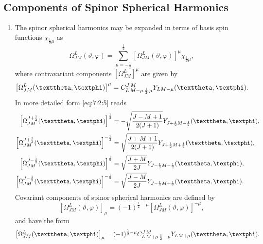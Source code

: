\subsection{Components of Spinor Spherical Harmonics}\label{sec:7.2.2}
\begin{enumerate}[label=(\alph*)]
\item The spinor spherical harmonics may be expanded in terms of basis spin functions $\chi_{\frac{1}{2} \mu}$ as
\begin{equation}
\Omega_{J M}^{L}(\vartheta, \varphi)=\sum_{\mu=-\frac{1}{2}}^{\frac{1}{2}}\left[\Omega_{J M}^{L}(\vartheta, \varphi)\right]^{\mu} \chi_{\frac{1}{2} \mu}, \label{eq:7:2:4}
\end{equation}
where contravariant components $\left[\Omega_{J M}^{L}\right]^{\mu}$ are given by
\begin{equation}
\left[\Omega_{J M}^{L}(\vartheta, \varphi)\right]^{\mu}=\clebsch{L}{M-\mu}{\frac{1}{2}}{\mu}{J}{M} Y_{L M-\mu}(\vartheta, \varphi). \label{eq:7:2:5}
\end{equation}
In more detailed form \eqref{eq:7:2:5} reads
\begin{align}
{\left[\Omega_{J M}^{J+\frac{1}{2}}(\vartheta, \varphi)\right]^{\frac{1}{2}} } & =-\sqrt{\frac{J-M+1}{2(J+1)}} Y_{J+\frac{1}{2} M-\frac{1}{2}}(\vartheta, \varphi), \notag\\
{\left[\Omega_{J M}^{J+\frac{1}{2}}(\vartheta, \varphi)\right]^{-\frac{1}{2}} } & =\sqrt{\frac{J+M+1}{2(J+1)}} Y_{J+\frac{1}{2} M+\frac{1}{2}}(\vartheta, \varphi), \label{eq:7:2:6}\\
{\left[\Omega_{J M}^{J-\frac{1}{2}}(\vartheta, \varphi)\right]^{\frac{1}{2}} } & =\sqrt{\frac{J+M}{2 J}} Y_{J-\frac{1}{2} M-\frac{1}{2}}(\vartheta, \varphi), \notag\\
{\left[\Omega_{J M}^{J-\frac{1}{2}}(\vartheta, \varphi)\right]^{-\frac{1}{2}} } & =\sqrt{\frac{J-M}{2 J}} Y_{J-\frac{1}{2} M+\frac{1}{2}}(\vartheta, \varphi). \label{eq:7:2:7}
\end{align}
Covariant components of spinor spherical harmonics are defined by
\begin{equation}
\left[\Omega_{J M}^{L}(\vartheta, \varphi)\right]_{\mu}=(-1)^{\frac{1}{2}-\mu}\left[\Omega_{J M}^{L}(\vartheta, \varphi)\right]^{-\mu}, \label{eq:7:2:8}
\end{equation}
and have the form
\begin{equation}
\left[\Omega_{J M}^{L}(\vartheta, \varphi)\right]_{\mu}=(-1)^{\frac{1}{2}-\mu} \clebsch{L}{M+\mu}{\frac{1}{2}}{-\mu}{J}{M} Y_{L M+\mu}(\vartheta, \varphi). \label{eq:7:2:9}

\end{equation}
\end{enumerate}

